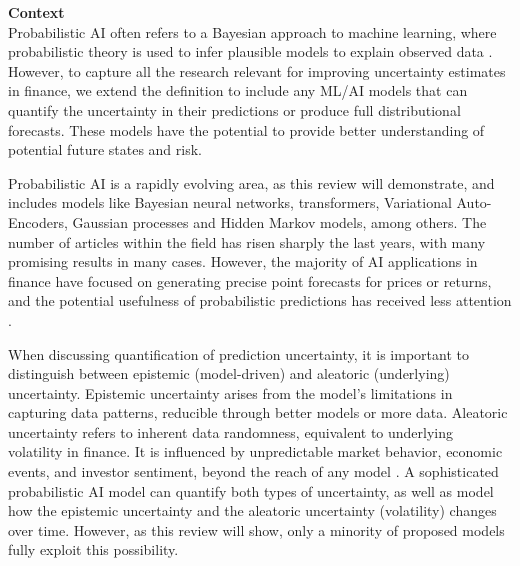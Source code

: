 \textbf{Context}\\
Probabilistic AI often refers to a Bayesian approach to machine learning, where probabilistic theory is used to infer plausible models to explain observed data \parencite{Ghahramani2015}. However, to capture all the research relevant for improving uncertainty estimates in finance, we extend the definition to include any ML/AI models that can quantify the uncertainty in their predictions or produce full distributional forecasts. These models have the potential to provide better understanding of potential future states and risk.

Probabilistic AI is a rapidly evolving area, as this review will demonstrate, and includes models like Bayesian neural networks, transformers, Variational Auto-Encoders, Gaussian processes and Hidden Markov models, among others. The number of articles within the field has risen sharply the last years, with many promising results in many cases. However, the majority of AI applications in finance have focused on generating precise point forecasts for prices or returns, and the potential usefulness of probabilistic predictions has received less attention \parencite{sezer2020financial}.

When discussing quantification of prediction uncertainty, it is important to distinguish between epistemic (model-driven) and aleatoric (underlying) uncertainty. Epistemic uncertainty arises from the model's limitations in capturing data patterns, reducible through better models or more data. Aleatoric uncertainty refers to inherent data randomness, equivalent to underlying volatility in finance. It is influenced by unpredictable market behavior, economic events, and investor sentiment, beyond the reach of any model \parencite[7,34]{pml1Book, KIUREGHIAN2009105, hullermeier2021aleatoric}. A sophisticated probabilistic AI model can quantify both types of uncertainty, as well as model how the epistemic uncertainty and the aleatoric uncertainty (volatility) changes over time. However, as this review will show, only a minority of proposed models fully exploit this possibility.



